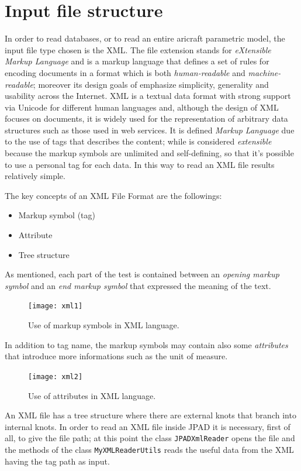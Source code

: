 \section{Input file structure}
In order to read databases, or to read an entire aricraft parametric model, the input file type chosen is the XML. The file extension stands for \emph{eXtensible Markup Language} and is a markup language that defines a set of rules for encoding documents in a format which is both \emph{human-readable} and \emph{machine-readable}; moreover its design goals of emphasize simplicity, generality and usability across the Internet. XML is a textual data format with strong support via Unicode for different human languages and, although the design of XML focuses on documents, it is widely used for the representation of arbitrary data structures such as those used in web services. It is defined \emph{Markup Language} due to the use of tags that describes the content; while is considered \emph{extensible} because the markup symbols are unlimited and self-defining, so that it's possible to use a personal tag for each data. In this way to read an XML file results relatively simple.\cite{wiki:xml}

\bigskip
\noindent
The key concepts of an XML File Format are the followings:
%
\begin{itemize}
\item Markup symbol (tag)
\item Attribute
\item Tree structure
\end{itemize}
%
As mentioned, each part of the test is contained between an \emph{opening markup symbol} and an \emph{end markup symbol} that expressed the meaning of the text.
%
\begin{figure}[H]
\centering
{\texttt{[image: xml1]}
} 
\caption{Use of markup symbols in XML language.}
\end{figure}
%
\noindent
In addition to tag name, the markup symbols may contain also some \emph{attributes} that introduce more informations such as the unit of measure.
%
\begin{figure}[H]
\centering
{\texttt{[image: xml2]} 
}
\caption{Use of attributes in XML language.}
\end{figure}
%
\noindent
An XML file has a tree structure where there are external knots that branch into internal knots. In order to read an XML file inside \gls{JPAD} it is necessary, first of all, to give the file path; at this point the class \lstinline[language=Java]!JPADXmlReader! opens the file and  the methods of the class \lstinline[language=Java]!MyXMLReaderUtils! reads the useful data from the XML having the tag path as input. 

